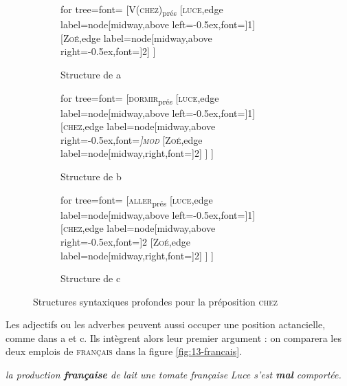 \begin{figure}
	\begin{subfigure}[b]{0.3\textwidth}
		\centering
		\begin{forest} for tree={font=\normalfont}
			[V(\textsc{chez})\textsubscript{prés}
			[\textsc{luce},edge label={node[midway,above left=-0.5ex,font=\footnotesize]{1}}]
			[\textsc{Zoé},edge label={node[midway,above right=-0.5ex,font=\footnotesize]{2}}]
			]
		\end{forest}
		\caption{Structure de a}
	\end{subfigure}%
	\hfill
	\begin{subfigure}[b]{0.3\textwidth}
		\centering
		\begin{forest} for tree={font=\normalfont}
			[\textsc{dormir}\textsubscript{prés}
			[\textsc{luce},edge label={node[midway,above left=-0.5ex,font=\footnotesize]{1}}]
			[\textsc{chez},edge label={node[midway,above right=-0.5ex,font=\footnotesize\itshape]{\textsc{mod}}}
			[\textsc{Zoé},edge label={node[midway,right,font=\footnotesize]{2}}]
			]
			]
		\end{forest}
		\caption{Structure de b}
	\end{subfigure}%
	\hfill
	\begin{subfigure}[b]{0.3\textwidth}
		\centering
		\begin{forest} for tree={font=\normalfont}
			[\textsc{aller}\textsubscript{prés}
			[\textsc{luce},edge label={node[midway,above left=-0.5ex,font=\footnotesize]{1}}]
			[\textsc{chez},edge label={node[midway,above right=-0.5ex,font=\footnotesize]{2}}
			[\textsc{Zoé},edge label={node[midway,right,font=\footnotesize]{2}}]
			]
			]
		\end{forest}
		\caption{Structure de c}
	\end{subfigure}
\caption{Structures syntaxiques profondes pour la préposition \textsc{chez}\label{fig:chez}}
\end{figure}

Les adjectifs ou les adverbes peuvent aussi occuper une position actancielle, comme dans a et c. Ils intègrent alors leur premier argument : on comparera les deux emplois de \textsc{français} dans la figure \ref{fig:13-francais}.

\ea\label{ex:13-francais}
\ea \textit{la production \textbf{française} de lait}
\ex \textit{une tomate française}
\ex \textit{Luce s’est \textbf{mal} comportée.}\z\z


